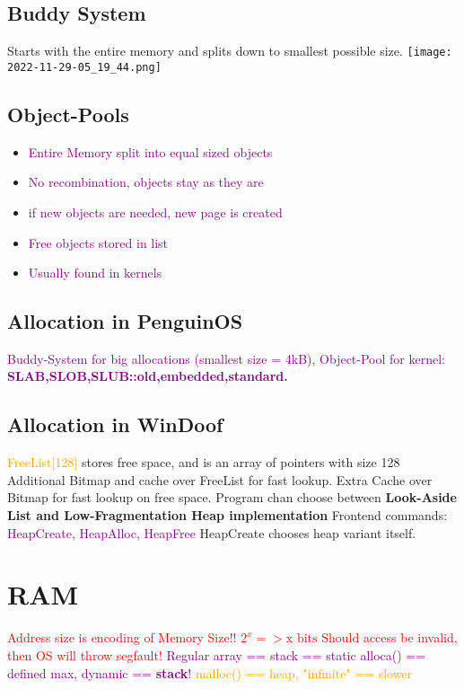 \documentclass[main.tex,fontsize=8pt,paper=a4,paper=landscape,DIV=calc,]{scrartcl}
\begin{document}
\begin{multicols*}{4}
\subsection{Buddy System}
Starts with the entire memory and splits down to smallest possible size.\newline
\texttt{[image: 2022-11-29-05\_19\_44.png]}

\subsection{Object-Pools}
\begin{itemize}
\item \textcolor{purple}{Entire Memory split into equal sized objects}
\item \textcolor{purple}{No recombination, objects stay as they are}
\item \textcolor{purple}{if new objects are needed, new page is created}
\item \textcolor{purple}{Free objects stored in list}
\item \textcolor{purple}{Usually found in kernels}
\end{itemize} 

\subsection{Allocation in PenguinOS}
\textcolor{purple}{Buddy-System for big allocations (smallest size = 4kB), Object-Pool for kernel: \newline 
\textbf{SLAB,SLOB,SLUB::old,embedded,standard.}}

\subsection{Allocation in WinDoof}
\textcolor{orange}{FreeList[128]} stores free space, and is an array of pointers with size 128\newline
Additional Bitmap and cache over FreeList for fast lookup.\newline
Extra Cache over Bitmap for fast lookup on free space.\newline
Program chan choose between \textbf{Look-Aside List and Low-Fragmentation Heap implementation}\newline
Frontend commands: \textcolor{purple}{HeapCreate, HeapAlloc, HeapFree}\newline
HeapCreate chooses heap variant itself.

\section{RAM}
\textcolor{red}{Address size is encoding of Memory Size!! \(2^x => \text{x bits}\)}\newline
\textcolor{red}{Should access be invalid, then OS will throw segfault!}\newline
\textcolor{purple}{Regular array == stack == static}\newline
\textcolor{purple}{alloca() == defined max, dynamic == \textbf{stack}!}\newline
\textcolor{orange}{malloc() == heap, "infinite" == slower} 


\end{multicols*}
\end{document}
